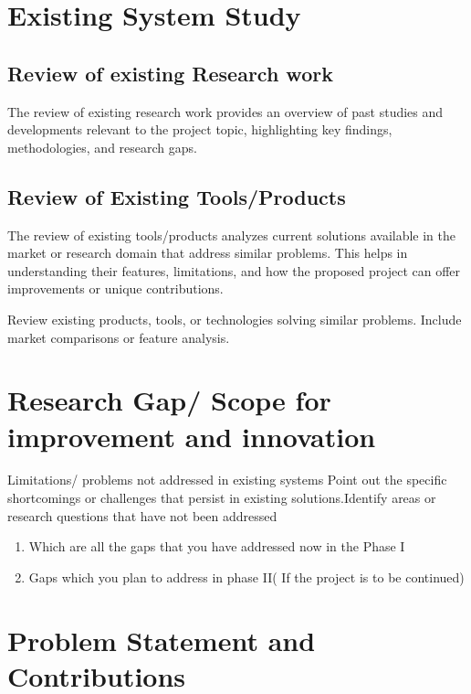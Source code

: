\label{chap.2}


\section{Existing System Study}
\subsection{Review of existing Research work}

The review of existing research work provides an overview of past studies and developments relevant to the project topic, highlighting key findings, methodologies, and research gaps. 
\subsection{Review of Existing Tools/Products}

The review of existing tools/products analyzes current solutions available in the market or research domain that address similar problems. This helps in understanding their features, limitations, and how the proposed project can offer improvements or unique contributions.

Review existing products, tools, or technologies solving similar problems.
Include market comparisons or feature analysis.

\section{Research Gap/ Scope for improvement and innovation}

Limitations/ problems not addressed in existing systems Point out the specific shortcomings or challenges that persist in existing solutions.Identify areas or research questions that have not been addressed
\begin{enumerate}
    \item Which are all the gaps that you have addressed now in the Phase I
    \item Gaps which you plan to address in phase II( If the project is to be continued)
\end{enumerate}


\section{Problem Statement and Contributions}

